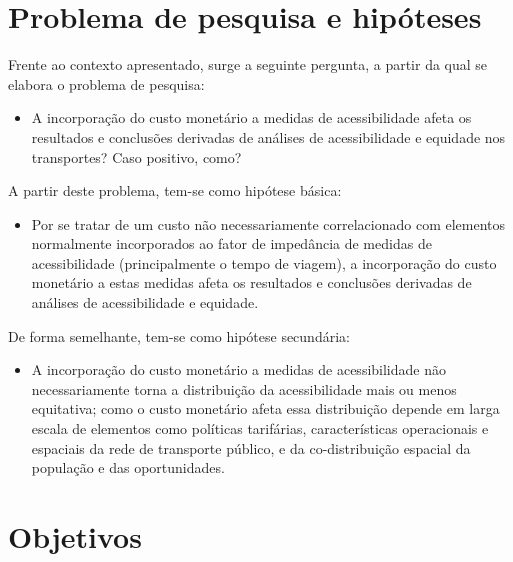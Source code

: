 \documentclass[msc,numbers]{coppe}
\providecommand{\tightlist}{%
  \setlength{\itemsep}{0pt}\setlength{\parskip}{0pt}}
\begin{document}
  \hypertarget{problema-de-pesquisa-e-hipuxf3teses}{%
  \section{Problema de pesquisa e hipóteses}\label{problema-de-pesquisa-e-hipuxf3teses}}

  Frente ao contexto apresentado, surge a seguinte pergunta, a partir da qual se elabora o problema de pesquisa:
  \begin{itemize}
  \tightlist
  \item
    A incorporação do custo monetário a medidas de acessibilidade afeta os resultados e conclusões derivadas de análises de acessibilidade e equidade nos transportes? Caso positivo, como?
  \end{itemize}
  A partir deste problema, tem-se como hipótese básica:
  \begin{itemize}
  \tightlist
  \item
    Por se tratar de um custo não necessariamente correlacionado com elementos normalmente incorporados ao fator de impedância de medidas de acessibilidade (principalmente o tempo de viagem), a incorporação do custo monetário a estas medidas afeta os resultados e conclusões derivadas de análises de acessibilidade e equidade.
  \end{itemize}
  De forma semelhante, tem-se como hipótese secundária:
  \begin{itemize}
  \tightlist
  \item
    A incorporação do custo monetário a medidas de acessibilidade não necessariamente torna a distribuição da acessibilidade mais ou menos equitativa; como o custo monetário afeta essa distribuição depende em larga escala de elementos como políticas tarifárias, características operacionais e espaciais da rede de transporte público, e da co-distribuição espacial da população e das oportunidades.
  \end{itemize}
  \hypertarget{objetivos}{%
  \section{Objetivos}\label{objetivos}}
\end{document}

